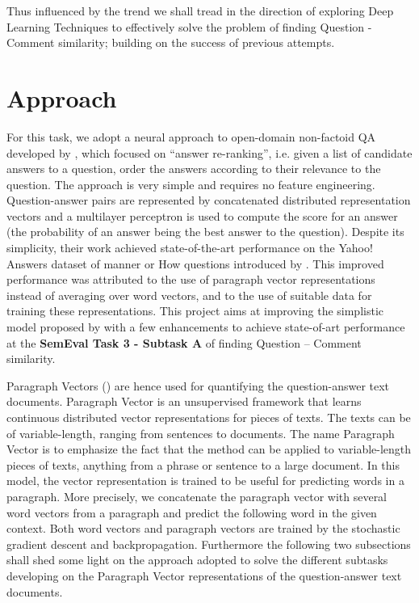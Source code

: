 \documentclass[12pt, a4paper, oneside]{Thesis} %
\newcommand{\mychapter}[2]{
    \setcounter{chapter}{#1}
    \setcounter{section}{0}
    \chapter*{#2}
    \addcontentsline{toc}{chapter}{#2}
    \lhead{\emph{#2}}
}
\begin{document}
Thus influenced by the trend we shall tread in the direction of exploring Deep Learning Techniques to effectively solve the problem of finding Question - Comment similarity; building on the success of previous attempts.



\mychapter{3}{Approach}

For this task, we adopt a neural approach to open-domain non-factoid QA developed by \cite{bogdanova2016we}, which focused on “answer re-ranking”, i.e. given a list of candidate answers to a question, order the answers according to their relevance to the question. The approach is very simple and requires no feature engineering. Question-answer pairs are represented by concatenated distributed representation vectors and a multilayer perceptron is used to compute the score for an answer (the probability of an answer being the best answer to the question). Despite its simplicity, their work achieved state-of-the-art performance on the Yahoo! Answers dataset of manner or How questions introduced by \cite{jansen2014discourse}. This improved performance was attributed to the use of paragraph vector representations instead of averaging over word vectors, and to the use of suitable data for training these representations. This project aims at improving the simplistic model proposed by \cite{bogdanova2016we} with a few enhancements to achieve state-of-art performance at the \textbf{SemEval Task 3 - Subtask A} of finding Question -- Comment similarity.

Paragraph Vectors (\cite{le2014distributed}) are hence used for quantifying the question-answer text documents. Paragraph Vector is an unsupervised framework that learns continuous distributed vector representations for pieces of texts. The texts can be of variable-length, ranging from sentences to documents. The name Paragraph Vector is to emphasize the fact that the method can be applied to variable-length pieces of texts, anything from a phrase or sentence to a large document. In this model, the vector representation is trained to be useful for predicting words in a paragraph. More precisely, we concatenate the paragraph vector with several word vectors from a paragraph and predict the following word in the given context. Both word vectors and paragraph vectors are trained by the stochastic gradient descent and backpropagation. Furthermore the following two subsections shall shed some light on the approach adopted to solve the different subtasks developing on the Paragraph Vector representations of the question-answer text documents.
\end{document}
